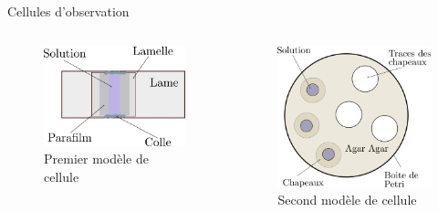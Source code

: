 \documentclass[11pt]{beamer}
\begin{document}
\begin{frame}{Cellules d'observation}
\begin{columns}
	\begin{figure}
		\centering
		\includegraphics[width=\linewidth]{Cellule1}
		\caption{Premier modèle de cellule}
		\label{fig:cellule1}
	\end{figure}
	
	\begin{figure}
	\centering
	\includegraphics[width=\linewidth]{Cellule2}
	\caption{Second modèle de cellule}
	\label{fig:cellule2}
	\end{figure}
\end{columns}
\end{frame}
\end{document}
